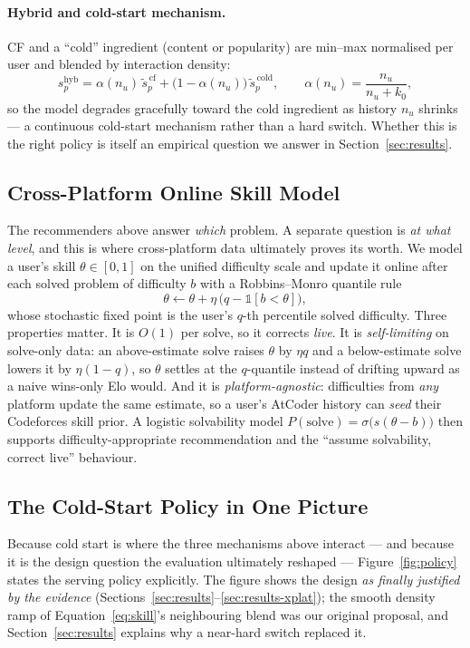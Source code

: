 \documentclass[12pt,a4paper]{article}
\begin{document}
\paragraph{Hybrid and cold-start mechanism.} CF and a ``cold'' ingredient (content or
popularity) are min--max normalised per user and blended by interaction density:
\begin{equation}
s^{\text{hyb}}_p = \alpha(n_u)\,\widetilde{s}^{\,\text{cf}}_p + \big(1-\alpha(n_u)\big)\,\widetilde{s}^{\,\text{cold}}_p ,
\qquad \alpha(n_u)=\frac{n_u}{n_u+k_0},
\end{equation}
so the model degrades gracefully toward the cold ingredient as history $n_u$ shrinks --- a
continuous cold-start mechanism rather than a hard switch. Whether this is the right
policy is itself an empirical question we answer in Section~\ref{sec:results}.

\subsection{Cross-Platform Online Skill Model}
\label{sec:design-skill}
The recommenders above answer \emph{which} problem. A separate question is \emph{at what
level}, and this is where cross-platform data ultimately proves its worth. We model a
user's skill $\theta\in[0,1]$ on the unified difficulty scale and update it online after
each solved problem of difficulty $b$ with a Robbins--Monro quantile rule
\begin{equation}
\theta \leftarrow \theta + \eta\,\big(q - \mathbb{1}[b<\theta]\big),
\label{eq:skill}
\end{equation}
whose stochastic fixed point is the user's $q$-th percentile solved difficulty. Three
properties matter. It is $O(1)$ per solve, so it corrects \emph{live}. It is
\emph{self-limiting} on solve-only data: an above-estimate solve raises $\theta$ by
$\eta q$ and a below-estimate solve lowers it by $\eta(1-q)$, so $\theta$ settles at the
$q$-quantile instead of drifting upward as a naive wins-only Elo would. And it is
\emph{platform-agnostic}: difficulties from \emph{any} platform update the same estimate,
so a user's AtCoder history can \emph{seed} their Codeforces skill prior. A logistic
solvability model $P(\text{solve})=\sigma\!\big(s(\theta-b)\big)$ then supports
difficulty-appropriate recommendation and the ``assume solvability, correct live''
behaviour.

\subsection{The Cold-Start Policy in One Picture}
\label{sec:design-coldstart}
Because cold start is where the three mechanisms above interact --- and because it is the
design question the evaluation ultimately reshaped --- Figure~\ref{fig:policy} states the
serving policy explicitly. The figure shows the design \emph{as finally justified by the
evidence} (Sections~\ref{sec:results}--\ref{sec:results-xplat}); the smooth density ramp
of Equation~\ref{eq:skill}'s neighbouring blend was our original proposal, and
Section~\ref{sec:results} explains why a near-hard switch replaced it.
\end{document}
